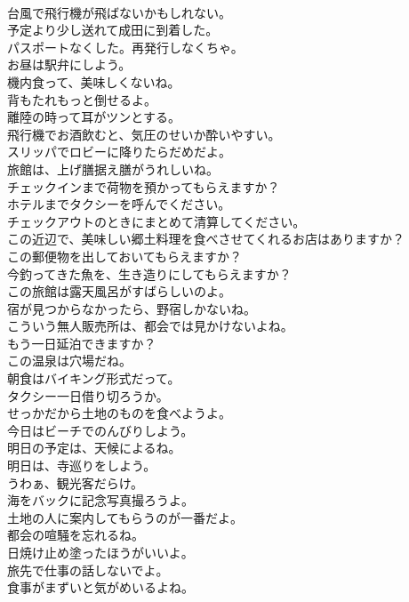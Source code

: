 \documentclass[8pt]{extreport}
\begin{document}
\begin{CJK}{UTF8}{min}
\\	台風で飛行機が飛ばないかもしれない。	
\\	予定より少し送れて成田に到着した。	
\\	パスポートなくした。再発行しなくちゃ。	
\\	お昼は駅弁にしよう。	
\\	機内食って、美味しくないね。	
\\	背もたれもっと倒せるよ。	
\\	離陸の時って耳がツンとする。	
\\	飛行機でお酒飲むと、気圧のせいか酔いやすい。	
\\	スリッパでロビーに降りたらだめだよ。	
\\	旅館は、上げ膳据え膳がうれしいね。	
\\	チェックインまで荷物を預かってもらえますか？	
\\	ホテルまでタクシーを呼んでください。	
\\	チェックアウトのときにまとめて清算してください。	
\\	この近辺で、美味しい郷土料理を食べさせてくれるお店はありますか？	
\\	この郵便物を出しておいてもらえますか？	
\\	今釣ってきた魚を、生き造りにしてもらえますか？	
\\	この旅館は露天風呂がすばらしいのよ。	
\\	宿が見つからなかったら、野宿しかないね。	
\\	こういう無人販売所は、都会では見かけないよね。	
\\	もう一日延泊できますか？	
\\	この温泉は穴場だね。	
\\	朝食はバイキング形式だって。	
\\	タクシー一日借り切ろうか。	
\\	せっかだから土地のものを食べようよ。	
\\	今日はビーチでのんびりしよう。	
\\	明日の予定は、天候によるね。	
\\	明日は、寺巡りをしよう。	
\\	うわぁ、観光客だらけ。	
\\	海をバックに記念写真撮ろうよ。	
\\	土地の人に案内してもらうのが一番だよ。	
\\	都会の喧騒を忘れるね。	
\\	日焼け止め塗ったほうがいいよ。	
\\	旅先で仕事の話しないでよ。	
\\	食事がまずいと気がめいるよね。	

\end{CJK}
\end{document}
